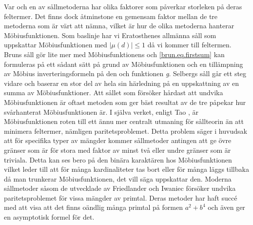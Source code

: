 Var och en av sållmetoderna har olika faktorer som påverkar storleken på deras feltermer.
Det finns dock åtminstone en gemensam faktor mellan de tre metoderna som är värt att nämna, vilket är hur de olika metoderna hanterar Möbiusfunktionen.
Som baslinje har vi Eratosthenes allmänna såll som uppskattar Möbiusfunktionen med \(|\mu(d)| \leq 1\) då vi kommer till feltermen.
Bruns såll  gör lite mer med Möbiusfunktionens och \eqref{brun.eq.firstsum} kan formuleras på ett sådant sätt på grund av Möbiusfunktionen och en tillämpning av Möbius inverteringsformeln på den och funktionen \textit{g}.
Selbergs såll går ett steg vidare och baserar en stor del av hela sin härledning på en uppskattning av en summa av Möbiusfunktioner.
Att sållet som försöker hårdast att undvika Möbiusfunktionen är oftast metoden som ger bäst resultat av de tre påpekar hur svårhanterat Möbiusfunktionen är.
I själva verket, enligt Tao \cite{Tao}, är Möbiusfunktionen roten till ett ännu mer centralt utmaning för sållteorin än att minimera feltermer, nämligen paritetsproblemet.
Detta problem säger i huvudsak att för specifika typer av mängder kommer sållmetoder antingen att ge övre gränser som är för stora med faktor av minst två eller undre gränser som är triviala.
Detta kan ses bero på den binära karaktären hos Möbiusfunktionen vilket leder till att för många kardinaliteter tas bort eller för många läggs tillbaka då man trunkerar Möbiusfunktionen, det vill säga uppskattar den.
Moderna sållmetoder såsom de utvecklade av Friedlander och Iwaniec \cite{abPrimes} försöker undvika paritetsproblemet för vissa mängder av primtal.
Deras metoder har haft succé med att visa att det finns oändlig många primtal på formen \(a^2+b^4\) och även ger en asymptotisk formel för det.


